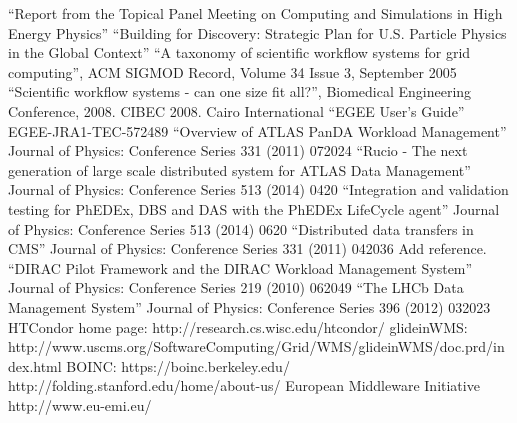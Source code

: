 \begin{thebibliography}{99}
 ``Report from the Topical Panel Meeting on Computing and
Simulations in High Energy Physics''
 ``Building for Discovery: Strategic Plan for U.S. Particle Physics in the Global Context''
 ``A taxonomy of scientific workflow systems for grid computing'', ACM SIGMOD Record, Volume 34 Issue 3, September 2005
 ``Scientific workflow systems - can one size fit all?'', Biomedical Engineering Conference, 2008. CIBEC 2008. Cairo International
 ``EGEE User’s Guide'' EGEE-JRA1-TEC-572489
 ``Overview of ATLAS PanDA Workload Management'' Journal of Physics: Conference Series 331 (2011) 072024
 ``Rucio - The next generation of large scale distributed system for ATLAS Data Management'' Journal of Physics: Conference Series 513 (2014) 0420
 ``Integration and validation testing for PhEDEx, DBS and DAS with the PhEDEx LifeCycle agent'' Journal of Physics: Conference Series 513 (2014) 0620
 ``Distributed data transfers in CMS'' Journal of Physics: Conference Series 331 (2011) 042036
 Add reference.
 ``DIRAC Pilot Framework and the DIRAC Workload Management System'' Journal of Physics: Conference Series 219 (2010) 062049
 ``The LHCb Data Management System'' Journal of Physics: Conference Series 396 (2012) 032023
 HTCondor home page: http://research.cs.wisc.edu/htcondor/
 glideinWMS: http://www.uscms.org/SoftwareComputing/Grid/WMS/glideinWMS/doc.prd/index.html
 BOINC: https://boinc.berkeley.edu/
 http://folding.stanford.edu/home/about-us/
 European Middleware Initiative http://www.eu-emi.eu/
\end{thebibliography}
